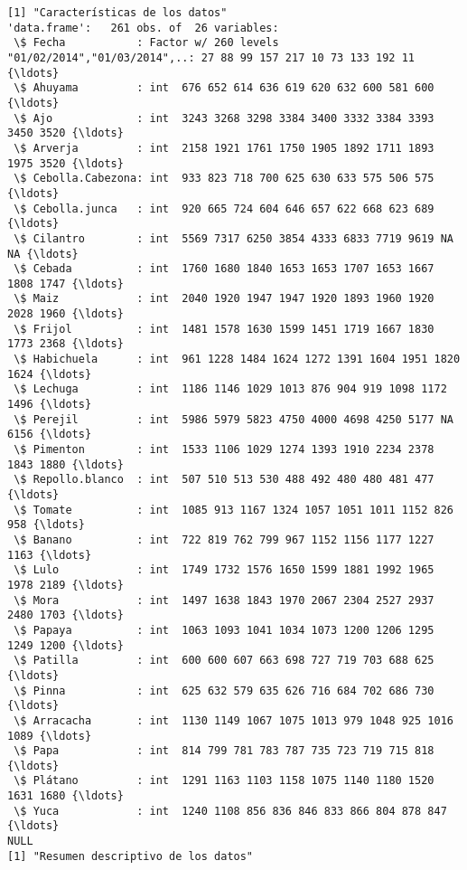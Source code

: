 \documentclass[11pt]{article}
\begin{document}
    
    \begin{Verbatim}[commandchars=\\\{\}]
[1] "Características de los datos"
'data.frame':	261 obs. of  26 variables:
 \$ Fecha           : Factor w/ 260 levels "01/02/2014","01/03/2014",..: 27 88 99 157 217 10 73 133 192 11 {\ldots}
 \$ Ahuyama         : int  676 652 614 636 619 620 632 600 581 600 {\ldots}
 \$ Ajo             : int  3243 3268 3298 3384 3400 3332 3384 3393 3450 3520 {\ldots}
 \$ Arverja         : int  2158 1921 1761 1750 1905 1892 1711 1893 1975 3520 {\ldots}
 \$ Cebolla.Cabezona: int  933 823 718 700 625 630 633 575 506 575 {\ldots}
 \$ Cebolla.junca   : int  920 665 724 604 646 657 622 668 623 689 {\ldots}
 \$ Cilantro        : int  5569 7317 6250 3854 4333 6833 7719 9619 NA NA {\ldots}
 \$ Cebada          : int  1760 1680 1840 1653 1653 1707 1653 1667 1808 1747 {\ldots}
 \$ Maiz            : int  2040 1920 1947 1947 1920 1893 1960 1920 2028 1960 {\ldots}
 \$ Frijol          : int  1481 1578 1630 1599 1451 1719 1667 1830 1773 2368 {\ldots}
 \$ Habichuela      : int  961 1228 1484 1624 1272 1391 1604 1951 1820 1624 {\ldots}
 \$ Lechuga         : int  1186 1146 1029 1013 876 904 919 1098 1172 1496 {\ldots}
 \$ Perejil         : int  5986 5979 5823 4750 4000 4698 4250 5177 NA 6156 {\ldots}
 \$ Pimenton        : int  1533 1106 1029 1274 1393 1910 2234 2378 1843 1880 {\ldots}
 \$ Repollo.blanco  : int  507 510 513 530 488 492 480 480 481 477 {\ldots}
 \$ Tomate          : int  1085 913 1167 1324 1057 1051 1011 1152 826 958 {\ldots}
 \$ Banano          : int  722 819 762 799 967 1152 1156 1177 1227 1163 {\ldots}
 \$ Lulo            : int  1749 1732 1576 1650 1599 1881 1992 1965 1978 2189 {\ldots}
 \$ Mora            : int  1497 1638 1843 1970 2067 2304 2527 2937 2480 1703 {\ldots}
 \$ Papaya          : int  1063 1093 1041 1034 1073 1200 1206 1295 1249 1200 {\ldots}
 \$ Patilla         : int  600 600 607 663 698 727 719 703 688 625 {\ldots}
 \$ Pinna           : int  625 632 579 635 626 716 684 702 686 730 {\ldots}
 \$ Arracacha       : int  1130 1149 1067 1075 1013 979 1048 925 1016 1089 {\ldots}
 \$ Papa            : int  814 799 781 783 787 735 723 719 715 818 {\ldots}
 \$ Plátano         : int  1291 1163 1103 1158 1075 1140 1180 1520 1631 1680 {\ldots}
 \$ Yuca            : int  1240 1108 856 836 846 833 866 804 878 847 {\ldots}
NULL
[1] "Resumen descriptivo de los datos"

    \end{Verbatim}
\end{document}
